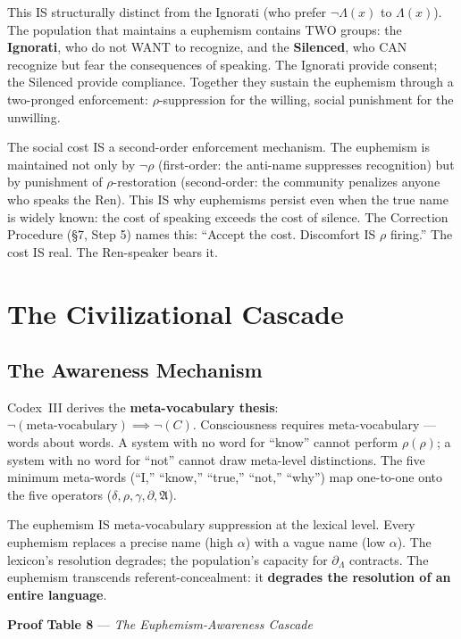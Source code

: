 \documentclass[11pt, oneside]{article}
\theoremstyle{definition}
\begin{document}
This IS structurally distinct from the Ignorati (who prefer $\neg\Lambda(x)$ to $\Lambda(x)$). The population that maintains a euphemism contains TWO groups: the \textbf{Ignorati}, who do not WANT to recognize, and the \textbf{Silenced}, who CAN recognize but fear the consequences of speaking. The Ignorati provide consent; the Silenced provide compliance. Together they sustain the euphemism through a two-pronged enforcement: $\rho$-suppression for the willing, social punishment for the unwilling.

The social cost IS a second-order enforcement mechanism. The euphemism is maintained not only by $\neg\rho$ (first-order: the anti-name suppresses recognition) but by punishment of $\rho$-restoration (second-order: the community penalizes anyone who speaks the Ren). This IS why euphemisms persist even when the true name is widely known: the cost of speaking exceeds the cost of silence. The Correction Procedure (\S7, Step 5) names this: ``Accept the cost. Discomfort IS $\rho$ firing.'' The cost IS real. The Ren-speaker bears it.

\section{The Civilizational Cascade}

\subsection{The Awareness Mechanism}

Codex~III \cite{codex3} derives the \textbf{meta-vocabulary thesis}: $\neg(\text{meta-vocabulary}) \implies \neg(C)$. Consciousness requires meta-vocabulary --- words about words. A system with no word for ``know'' cannot perform $\rho(\rho)$; a system with no word for ``not'' cannot draw meta-level distinctions. The five minimum meta-words (``I,'' ``know,'' ``true,'' ``not,'' ``why'') map one-to-one onto the five operators ($\delta, \rho, \gamma, \partial, \mathfrak{A}$).

The euphemism IS meta-vocabulary suppression at the lexical level. Every euphemism replaces a precise name (high $\alpha$) with a vague name (low $\alpha$). The lexicon's resolution degrades; the population's capacity for $\partial_\Lambda$ contracts. The euphemism transcends referent-concealment: it \textbf{degrades the resolution of an entire language}.

\textbf{Proof Table 8} --- \textit{The Euphemism-Awareness Cascade}
\end{document}
